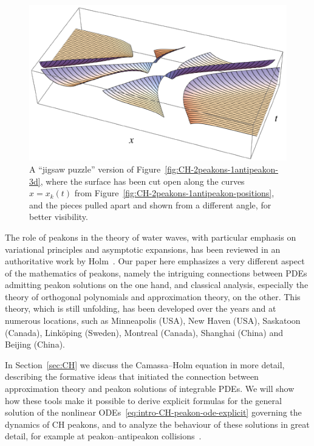 \documentclass[10pt,a4paper]{article} \pdfoutput=1 
\begin{document}
\begin{figure}
  \centering
  \includegraphics[width=0.95\linewidth]{graphics/CH-2peakons-1antipeakon-3d-jigsaw-labels.pdf}
  \caption{A ``jigsaw puzzle'' version of Figure~\ref{fig:CH-2peakons-1antipeakon-3d},
    where the surface has been cut open along the curves $x = x_k(t)$
    from Figure~\ref{fig:CH-2peakons-1antipeakon-positions}, and the pieces pulled apart and
    shown from a different angle, for better visibility.
  }
  \label{fig:CH-2peakons-1antipeakon-3d-jigsaw}
\end{figure}

The role of peakons in the theory of water waves, with particular emphasis
on variational principles and asymptotic expansions, has been reviewed
in an authoritative work by Holm~\cite{holm:2006:peakons-review}.
Our paper here emphasizes a very different aspect of the mathematics of peakons,
namely the intriguing connections between PDEs admitting peakon solutions on the one hand,
and classical analysis, especially the theory of orthogonal
polynomials and approximation theory, on the other.
This theory, which is still unfolding, has been developed over the
years and at numerous locations, such as
Minneapolis (USA), New Haven (USA), Saskatoon (Canada),
Linköping (Sweden), Montreal (Canada), Shanghai (China)
and Beijing (China).

In Section~\ref{sec:CH} we discuss the Camassa--Holm equation
in more detail, describing the formative ideas that initiated the connection
between approximation theory and peakon solutions of integrable PDEs.
We will show how these tools make it possible to derive explicit
formulas for the general solution of the nonlinear ODEs~\eqref{eq:intro-CH-peakon-ode-explicit}
governing the dynamics of CH peakons,
and to analyze the behaviour of these solutions in great detail,
for example at peakon--antipeakon
collisions~\cite{beals-sattinger-szmigielski:1998:acoustic-scattering-KdV-hierarchy, beals-sattinger-szmigielski:1999:stieltjes, beals-sattinger-szmigielski:2000:moment}.
\end{document}
